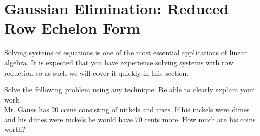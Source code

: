 \newpage\section{Gaussian Elimination: Reduced Row Echelon Form}
Solving systems of equations is one of the most essential applications of linear algebra.
It is expected that you have experience solving systems with row reduction so as such we
will cover it quickly in this section.

\begin{problem}
    Solve the following problem using any technique.  Be able to clearly explain your
    work.\\
    Mr. Gauss has 20 coins consisting of nickels and imes.  If his nickels were dimes and
    his dimes were nickels he would have 70 cents more.  How much are his coins worth?
\end{problem}

